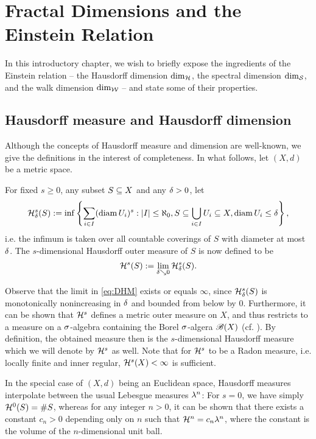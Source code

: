 \chapter{Fractal Dimensions and the Einstein Relation}

In this introductory chapter, we wish to briefly expose the ingredients of the Einstein relation -- the Hausdorff dimension $\dim_{\mathcal{H}}$, the spectral dimension $\dim_{\mathcal{S}}$, and the walk dimension $\dim_{\mathcal{W}}$ -- and state some of their properties. 

\section{Hausdorff measure and Hausdorff dimension}

Although the concepts of Hausdorff measure and dimension are well-known, we give the definitions in the interest of completeness. In what follows, let $(X,d)$ be a metric space.
\begin{defin}
  For fixed $s\geq0$, any subset $S\subseteq X$ and any $\delta>0$, let 
  \[
    \mathcal{H}^s_\delta(S)
      :=\inf \left\{\sum_{i\in I}(\operatorname{diam} U_i)^s:
            |I|\leq\aleph_0,S\subseteq\bigcup_{i\in I}U_i\subseteq X,\operatorname{diam} U_i\leq\delta\right\},
  \]
  i.e. the infimum is taken over all countable coverings of $S$ with diameter at most $\delta$. The $s$-dimensional Hausdorff outer measure of $S$ is now defined to be
  \begin{equation}\label{eq:DHM}
    \mathcal{H}^s(S):=\lim_{\delta\searrow0}\mathcal{H}^s_\delta(S).
  \end{equation}
\end{defin}
Observe that the limit in \eqref{eq:DHM} exists or equals $\infty$, since $\mathcal{H}^s_\delta(S)$ is monotonically nonincreasing in $\delta$ and bounded from below by 0. Furthermore, it can be shown that $\mathcal{H}^s$ defines a metric outer measure on $X$, and thus restricts to a measure on a $\sigma$-algebra containing the Borel $\sigma$-algera $\mathscr{B}(X)$ (cf. \cite[p.54ff]{mattila1999geometry}). By definition, the obtained measure then is the $s$-dimensional Hausdorff measure which we will denote by $\mathcal{H}^s$ as well. Note that for $\mathcal{H}^s$ to be a Radon measure, i.e. locally finite and inner regular, $\mathcal{H}^s(X)<\infty$ is sufficient.

In the special case of $(X,d)$ being an Euclidean space, Hausdorff measures interpolate between the usual Lebesgue measures $\lambda^n$: For $s=0$, we have simply $\mathcal{H}^0(S)=\# S$, whereas for any integer $n>0$, it can be shown that there exists a constant $c_n>0$ depending only on $n$ such that $\mathcal{H}^n=c_n\lambda^n$, where the constant is the volume of the $n$-dimensional unit ball.

